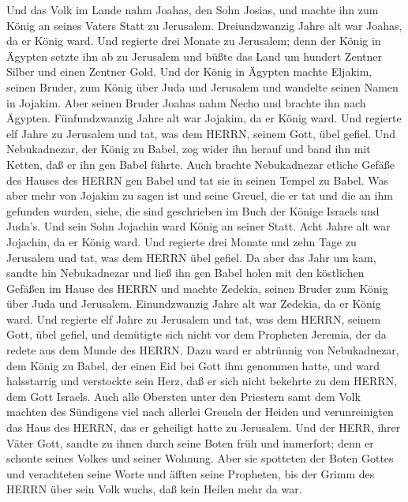  Und das Volk im Lande nahm Joahas, den Sohn Josias, und
machte ihn zum König an seines Vaters Statt zu Jerusalem. 
Dreiundzwanzig Jahre alt war Joahas, da er König ward. Und regierte drei
Monate zu Jerusalem;  denn der König in Ägypten setzte ihn
ab zu Jerusalem und büßte das Land um hundert Zentner Silber und einen
Zentner Gold.  Und der König in Ägypten machte Eljakim,
seinen Bruder, zum König über Juda und Jerusalem und wandelte seinen
Namen in Jojakim. Aber seinen Bruder Joahas nahm Necho und brachte ihn
nach Ägypten.  Fünfundzwanzig Jahre alt war Jojakim, da er
König ward. Und regierte elf Jahre zu Jerusalem und tat, was dem HERRN,
seinem Gott, übel gefiel.  Und Nebukadnezar, der König zu
Babel, zog wider ihn herauf und band ihn mit Ketten, daß er ihn gen
Babel führte.  Auch brachte Nebukadnezar etliche Gefäße des
Hauses des HERRN gen Babel und tat sie in seinen Tempel zu Babel.
 Was aber mehr von Jojakim zu sagen ist und seine Greuel,
die er tat und die an ihm gefunden wurden, siehe, die sind geschrieben
im Buch der Könige Israels und Juda's. Und sein Sohn Jojachin ward König
an seiner Statt.  Acht Jahre alt war Jojachin, da er König
ward. Und regierte drei Monate und zehn Tage zu Jerusalem und tat, was
dem HERRN übel gefiel.  Da aber das Jahr um kam, sandte hin
Nebukadnezar und ließ ihn gen Babel holen mit den köstlichen Gefäßen im
Hause des HERRN und machte Zedekia, seinen Bruder zum König über Juda
und Jerusalem.  Einundzwanzig Jahre alt war Zedekia, da er
König ward. Und regierte elf Jahre zu Jerusalem  und tat,
was dem HERRN, seinem Gott, übel gefiel, und demütigte sich nicht vor
dem Propheten Jeremia, der da redete aus dem Munde des HERRN.
 Dazu ward er abtrünnig von Nebukadnezar, dem König zu
Babel, der einen Eid bei Gott ihm genommen hatte, und ward halsstarrig
und verstockte sein Herz, daß er sich nicht bekehrte zu dem HERRN, dem
Gott Israels.  Auch alle Obersten unter den Priestern samt
dem Volk machten des Sündigens viel nach allerlei Greueln der Heiden und
verunreinigten das Haus des HERRN, das er geheiligt hatte zu Jerusalem.
 Und der HERR, ihrer Väter Gott, sandte zu ihnen durch
seine Boten früh und immerfort; denn er schonte seines Volkes und seiner
Wohnung.  Aber sie spotteten der Boten Gottes und
verachteten seine Worte und äfften seine Propheten, bis der Grimm des
HERRN über sein Volk wuchs, daß kein Heilen mehr da war. 
